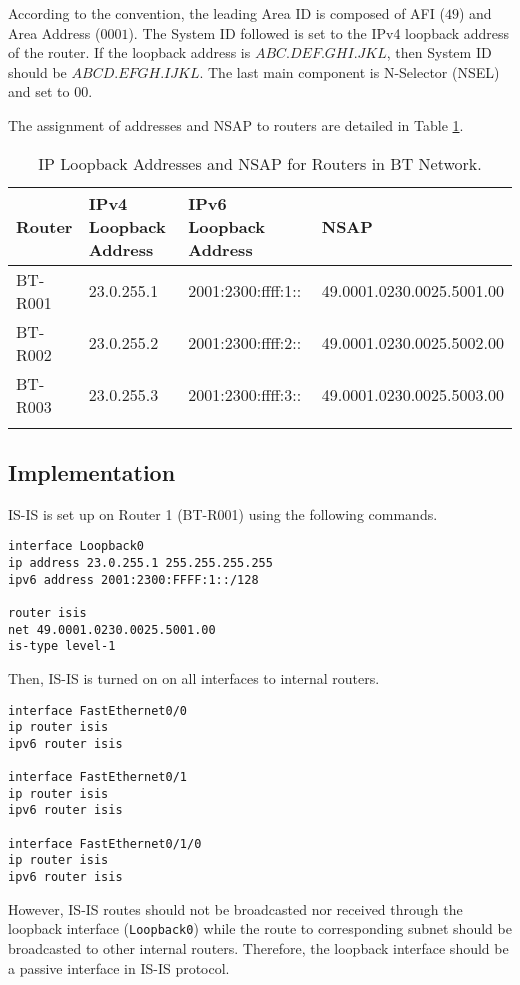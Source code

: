 According to the convention, the leading Area ID is composed of AFI ($49$) and Area Address ($0001$). 
The System ID followed is set to the IPv4 loopback address of the router. If the loopback address is $ABC.DEF.GHI.JKL$, then System ID should be $ABCD.EFGH.IJKL$.
The last main component is N-Selector (NSEL) and set to $00$.

The assignment of addresses and NSAP to routers are detailed in Table \ref{tab:isis}.

\begin{longtable}[]{@{}llll@{}}
\toprule
Router & IPv4 Loopback Address & IPv6 Loopback Address & NSAP\tabularnewline
\midrule
\endhead
BT-R001 & 23.0.255.1 & 2001:2300:ffff:1:: & 49.0001.0230.0025.5001.00\tabularnewline
BT-R002 & 23.0.255.2 & 2001:2300:ffff:2:: & 49.0001.0230.0025.5002.00\tabularnewline
BT-R003 & 23.0.255.3 & 2001:2300:ffff:3:: & 49.0001.0230.0025.5003.00\tabularnewline
\bottomrule
\caption{IP Loopback Addresses and NSAP for Routers in BT Network.}
\label{tab:isis}
\end{longtable}

\clearpage

\subsection{Implementation}

IS-IS is set up on Router 1 (BT-R001) using the following commands.

\begin{lstlisting}
interface Loopback0
ip address 23.0.255.1 255.255.255.255
ipv6 address 2001:2300:FFFF:1::/128

router isis
net 49.0001.0230.0025.5001.00
is-type level-1
\end{lstlisting}

Then, IS-IS is turned on on all interfaces to internal routers.

\begin{lstlisting}
interface FastEthernet0/0
ip router isis
ipv6 router isis

interface FastEthernet0/1
ip router isis
ipv6 router isis

interface FastEthernet0/1/0
ip router isis
ipv6 router isis
\end{lstlisting}


However, IS-IS routes should not be broadcasted nor received through the loopback interface (\texttt{Loopback0}) while the route to corresponding subnet should be broadcasted to other internal routers. Therefore, the loopback interface should be a passive interface in IS-IS protocol.

